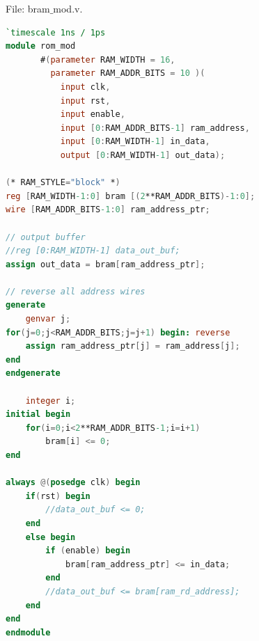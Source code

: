 \documentclass[a4paper,twoside,11pt, fleqn]{article}
\begin{document}
File: bram$\_$mod.v.
\begin{lstlisting}[language=Verilog]
`timescale 1ns / 1ps
module rom_mod
       #(parameter RAM_WIDTH = 16,
         parameter RAM_ADDR_BITS = 10 )(
           input clk,
           input rst,
           input enable,
           input [0:RAM_ADDR_BITS-1] ram_address,
           input [0:RAM_WIDTH-1] in_data,
           output [0:RAM_WIDTH-1] out_data);

(* RAM_STYLE="block" *)
reg [RAM_WIDTH-1:0] bram [(2**RAM_ADDR_BITS)-1:0];
wire [RAM_ADDR_BITS-1:0] ram_address_ptr;

// output buffer
//reg [0:RAM_WIDTH-1] data_out_buf;
assign out_data = bram[ram_address_ptr];

// reverse all address wires
generate
    genvar j;
for(j=0;j<RAM_ADDR_BITS;j=j+1) begin: reverse
    assign ram_address_ptr[j] = ram_address[j];
end
endgenerate

    integer i;
initial begin
    for(i=0;i<2**RAM_ADDR_BITS-1;i=i+1)
        bram[i] <= 0;
end

always @(posedge clk) begin
    if(rst) begin
        //data_out_buf <= 0;
    end
    else begin
        if (enable) begin
            bram[ram_address_ptr] <= in_data;
        end
        //data_out_buf <= bram[ram_rd_address];
    end
end
endmodule
\end{lstlisting}
\end{document}
